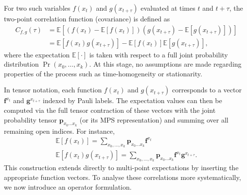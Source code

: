 For two such variables \(f(x_t)\) and \(g(x_{t+\tau})\) evaluated at times \(t\) and \(t+\tau\), the two-point correlation function (covariance) is defined as 
\begin{equation}
    \begin{split}
        C_{f,g}(\tau) 
        &= \mathbb{E}[(f(x_t) - \mathbb{E}[f(x_t)])(g(x_{t+\tau}) - \mathbb{E}[g(x_{t+\tau})])] \\
        &= \mathbb{E}[f(x_t) g(x_{t+\tau})] - \mathbb{E}[f(x_t)] \mathbb{E}[g(x_{t+\tau})],
    \end{split}
\end{equation}
where the expectation \(\mathbb{E}[\cdot]\) is taken with respect to a full joint probability distribution \(\Pr{(x_0,\dots,x_k)}\). At this stage, no assumptions are made regarding properties of the process such as time-homogeneity or stationarity.

In tensor notation, each function \(f(x_t)\) and \(g(x_{t+\tau})\) corresponds to a vector \(\mathbf{f}^{x_t}\) and \(\mathbf{g}^{x_{t+\tau}}\) indexed by Pauli labels. The expectation values can then be computed via the full tensor contraction of these vectors with the joint probability tensor \(\mathbf{p}_{x_0\dots x_k}\) (or its MPS representation) and summing over all remaining open indices. For instance,
\begin{equation}
    \begin{gathered}
        \mathbb{E}[f(x_t)]
        = \sum_{x_0,\dots,x_k} \mathbf{p}_{x_0\dots x_k} 
        \mathbf{f}^{x_t} \\
        \mathbb{E}[f(x_t) g(x_{t+\tau})] 
        = \sum_{x_0,\dots,x_k} \mathbf{p}_{x_0\dots x_k} 
        \mathbf{f}^{x_t} \mathbf{g}^{x_{t+\tau}}.
    \end{gathered}
\end{equation}
This construction extends directly to multi-point expectations by inserting the appropriate function vectors. To analyse these correlations more systematically, we now introduce an operator formulation.


